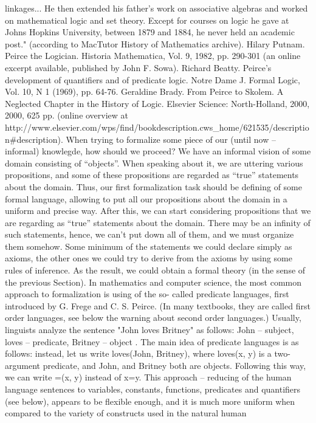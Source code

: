linkages... He then extended his father's work on associative algebras and worked on mathematical logic and set theory. Except
for courses on logic he gave at Johns Hopkins University, between 1879 and 1884, he never held an academic post."
(according to MacTutor History of Mathematics archive).
Hilary Putnam. Peirce the Logician. Historia Mathematica, Vol. 9, 1982, pp. 290-301 (an online excerpt available, published
by John F. Sowa).
Richard Beatty. Peirce's development of quantifiers and of predicate logic. Notre Dame J. Formal Logic, Vol. 10, N 1 (1969),
pp. 64-76.
Geraldine Brady. From Peirce to Skolem. A Neglected Chapter in the History of Logic. Elsevier Science: North-Holland, 2000,
2000, 625 pp. (online overview at
http://www.elsevier.com/wps/find/bookdescription.cws_home/621535/description#description).
When trying to formalize some piece of our (until now – informal) knowlegde, how should we proceed?
We have an informal vision of some domain consisting of “objects”. When speaking about it, we are
uttering various propositions, and some of these propositions are regarded as “true” statements about the
domain.
Thus, our first formalization task should be defining of some formal language, allowing to put all our
propositions about the domain in a uniform and precise way.
After this, we can start considering propositions that we are regarding as “true” statements about the
domain. There may be an infinity of such statements, hence, we can't put down all of them, and we must
organize them somehow. Some minimum of the statements we could declare simply as axioms, the other
ones we could try to derive from the axioms by using some rules of inference.
As the result, we could obtain a formal theory (in the sense of the previous Section).
In mathematics and computer science, the most common approach to formalization is using of the so-
called predicate languages, first introduced by G. Frege and C. S. Peirce.
(In many textbooks, they are called first order languages, see below the warning about second order languages.)
Usually, linguists analyze the sentence "John loves Britney" as follows: John – subject, loves – predicate,
Britney – object . The main idea of predicate languages is as follows: instead, let us write loves(John,
Britney), where loves(x, y) is a two-argument predicate, and John, and Britney both are objects. Following
this way, we can write =(x, y) instead of x=y. This approach – reducing of the human language sentences
to variables, constants, functions, predicates and quantifiers (see below), appears to be flexible enough,
and it is much more uniform when compared to the variety of constructs used in the natural human
